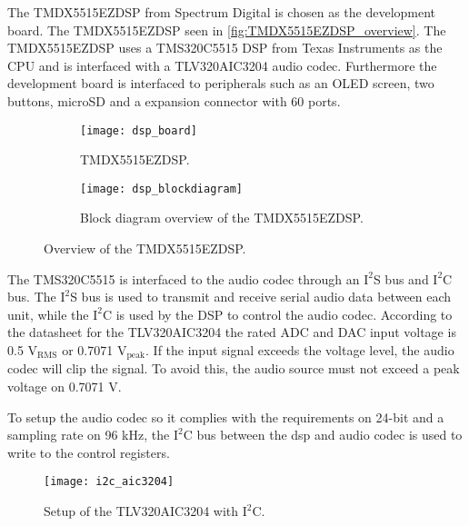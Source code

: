 The TMDX5515EZDSP from Spectrum Digital is chosen as the development board. The TMDX5515EZDSP seen in \autoref{fig:TMDX5515EZDSP_overview}. The TMDX5515EZDSP uses a TMS320C5515 DSP from Texas Instruments as the CPU and is interfaced with a TLV320AIC3204 audio codec. Furthermore the development board is interfaced to peripherals such as an OLED screen, two buttons, microSD and a expansion connector with 60 ports. 

\begin{figure}[H]
\centering
\begin{subfigure}[t]{0.47\textwidth}
\texttt{[image: dsp\_board]}
	\caption{TMDX5515EZDSP.}
	\label{fig:TMDX5515EZDSP}
\end{subfigure}
\hspace{6mm} 
\begin{subfigure}[t]{0.35\textwidth}
\texttt{[image: dsp\_blockdiagram]}
	\caption{Block diagram overview of the TMDX5515EZDSP.}
	\label{fig:TMDX5515EZDSP_blockdiagram}
\end{subfigure}
\caption{Overview of the TMDX5515EZDSP.}
\label{fig:TMDX5515EZDSP_overview}
\end{figure}

The TMS320C5515 is interfaced to the audio codec through an $\text{I}^2$S bus and $\text{I}^2$C bus. The $\text{I}^2$S bus is used to transmit and receive serial audio data between each unit, while the $\text{I}^2$C is used by the DSP to control the audio codec. According to the datasheet for the TLV320AIC3204 the rated ADC and DAC input voltage is 0.5 $\text{V}_\text{RMS}$ or 0.7071 $\text{V}_\text{peak}$. If the input signal exceeds the voltage level, the audio codec will clip the signal. To avoid this, the audio source must not exceed a peak voltage on 0.7071 V.

To setup the audio codec so it complies with the requirements on 24-bit and a sampling rate on 96 kHz, the $\text{I}^2$C bus between the dsp and audio codec is used to write to the control registers. 


\begin{figure}[H]
\centering
\texttt{[image: i2c\_aic3204]}
\caption{Setup of the TLV320AIC3204 with $\text{I}^2$C.}
\label{fig:i2c_aic3204}
\end{figure}  









